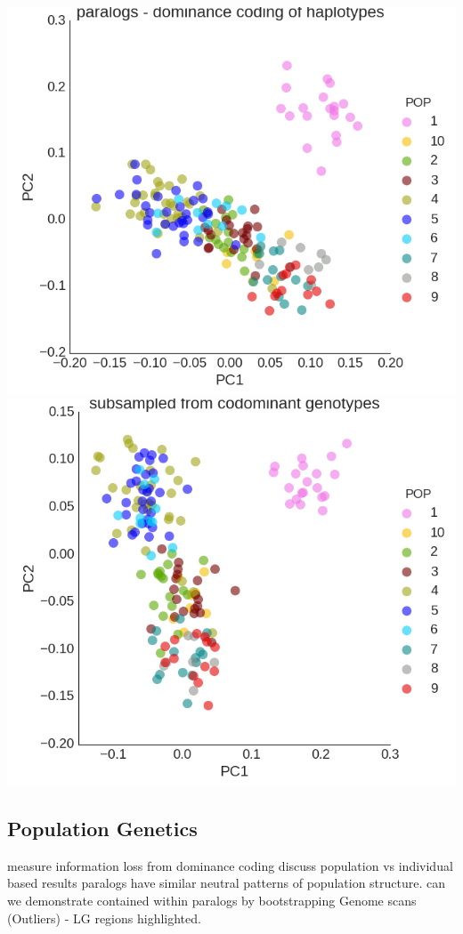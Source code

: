 \documentclass[12pt,  one column]{article}
\begin{document}
\includegraphics[scale=.3]{figures/PCA_dom_paralogs.png}
\includegraphics[scale=.3]{figures/PCA_codom_subsample.png}
\subsection*{Population Genetics}



measure information loss from dominance coding
discuss population vs individual based results
paralogs have similar neutral patterns of population structure.
can we demonstrate contained within paralogs by bootstrapping 
Genome scans (Outliers) - LG regions highlighted.
\end{document}

